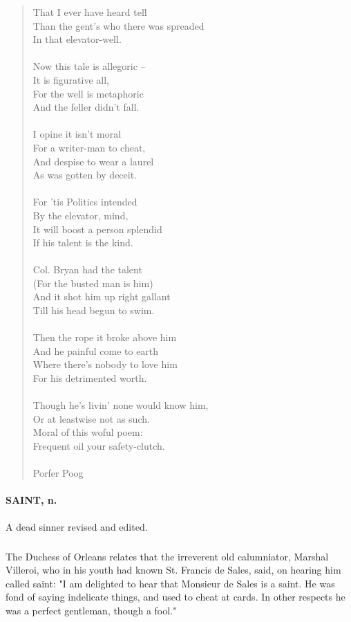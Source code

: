 \documentclass[11pt]{article}
\begin{document}
\begin{quote}
      That I ever have heard tell \\
  Than the gent's who there was spreaded \\
      In that elevator-well. \\
 \\
  Now this tale is allegoric -- \\
      It is figurative all, \\
  For the well is metaphoric \\
      And the feller didn't fall. \\
 \\
  I opine it isn't moral \\
      For a writer-man to cheat, \\
  And despise to wear a laurel \\
      As was gotten by deceit. \\
 \\
  For 'tis Politics intended \\
      By the elevator, mind, \\
  It will boost a person splendid \\
      If his talent is the kind. \\
 \\
  Col. Bryan had the talent \\
      (For the busted man is him) \\
  And it shot him up right gallant \\
      Till his head begun to swim. \\
 \\
  Then the rope it broke above him \\
      And he painful come to earth \\
  Where there's nobody to love him \\
      For his detrimented worth. \\
 \\
  Though he's livin' none would know him, \\
      Or at leastwise not as such. \\
  Moral of this woful poem: \\
      Frequent oil your safety-clutch. \\
 \\
Porfer Poog \end{quote}


\paragraph{SAINT, n.}  A dead sinner revised and edited.
\subparagraph{}   The Duchess of Orleans relates that the irreverent old
calumniator, Marshal Villeroi, who in his youth had known St. Francis
de Sales, said, on hearing him called saint:  "I am delighted to hear
that Monsieur de Sales is a saint.  He was fond of saying indelicate
things, and used to cheat at cards.  In other respects he was a
perfect gentleman, though a fool."
\end{document}
